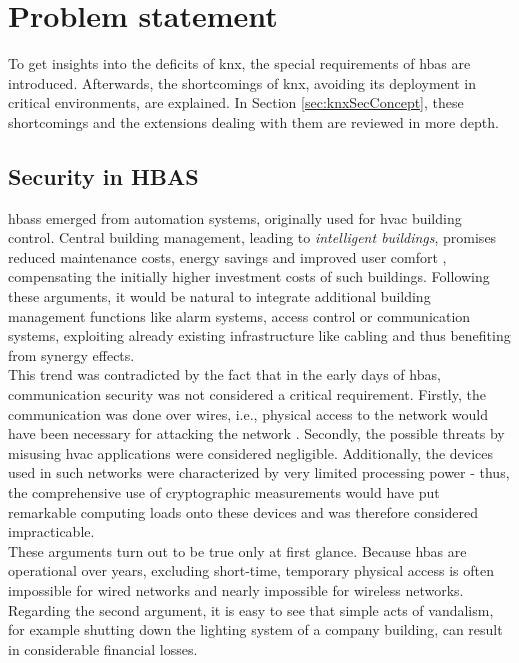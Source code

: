 \section{Problem statement}
To get insights into the deficits of \gls{knx}, the special requirements of \gls{hbas} are introduced. Afterwards, the shortcomings of \gls{knx}, avoiding its
deployment in critical environments, are explained. In Section \ref{sec:knxSecConcept}, these shortcomings and the extensions dealing with them are reviewed in more depth.

\subsection{Security in HBAS}\label{hbaSec}
\glspl{hbas} emerged from automation systems, originally used for \gls{hvac} building control.
Central building management, leading to \textit{intelligent buildings}, promises
reduced maintenance costs, energy savings and improved user comfort \cite{1435745}, compensating the initially higher investment costs of such buildings.
Following these arguments, it would be natural to integrate additional building management functions like alarm systems, access control or communication systems,
exploiting already existing infrastructure like cabling and thus benefiting from synergy effects.
\\
This trend was contradicted by the fact that in the early days of \gls{hbas}, communication security was not considered a critical requirement.
Firstly, the communication was done over wires,
i.e., physical access to the network would have been necessary for attacking the network \cite{knxSpec}. Secondly, the possible threats by misusing \gls{hvac} applications
were considered negligible. Additionally, the devices used in such networks were characterized by very limited processing power - thus, the comprehensive
use of cryptographic measurements would have put remarkable computing loads onto these devices and was therefore considered impracticable.
\\
These arguments turn out to be true only at first glance. Because \gls{hbas} are operational over years, excluding short-time, temporary physical access is often impossible
for wired networks and nearly impossible for
wireless networks. Regarding the second argument, it is easy to see that simple acts of vandalism, for example shutting down the lighting system of a company building, can result
in considerable financial losses.
\\
\\
